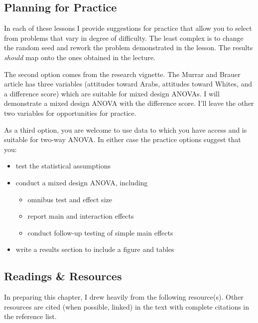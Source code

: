 \documentclass[
  11pt,
]{book}
\providecommand{\tightlist}{%
  \setlength{\itemsep}{0pt}\setlength{\parskip}{0pt}}
\begin{document}
\hypertarget{planning-for-practice-7}{%
\subsection{Planning for Practice}\label{planning-for-practice-7}}

In each of these lessons I provide suggestions for practice that allow you to select from problems that vary in degree of difficulty. The least complex is to change the random seed and rework the problem demonstrated in the lesson. The results \emph{should} map onto the ones obtained in the lecture.

The second option comes from the research vignette. The Murrar and Brauer \citeyearpar{murrar_entertainment-education_2018} article has three variables (attitudes toward Arabs, attitudes toward Whites, and a difference score) which are suitable for mixed design ANOVAs. I will demonstrate a mixed design ANOVA with the difference score. I'll leave the other two variables for opportunities for practice.

As a third option, you are welcome to use data to which you have access and is suitable for two-way ANOVA. In either case the practice options suggest that you:

\begin{itemize}
\tightlist
\item
  test the statistical assumptions
\item
  conduct a mixed design ANOVA, including

  \begin{itemize}
  \tightlist
  \item
    omnibus test and effect size
  \item
    report main and interaction effects
  \item
    conduct follow-up testing of simple main effects
  \end{itemize}
\item
  write a results section to include a figure and tables
\end{itemize}

\hypertarget{readings-resources-7}{%
\subsection{Readings \& Resources}\label{readings-resources-7}}

In preparing this chapter, I drew heavily from the following resource(s). Other resources are cited (when possible, linked) in the text with complete citations in the reference list.
\end{document}

